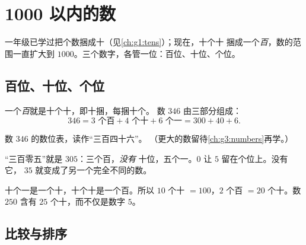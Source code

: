 \chapter{1000 以内的数}\label{ch:g2:numbers}

一年级已学过把个数捆成十（见\cref{ch:g1:tens}）；现在，十个十
捆成一个\emph{百}，数的范围一直扩大到
$1000$。三个数字，各管一位：百位、十位、个位。

\section{百位、十位、个位}

\begin{definition}[三个数位]\label{def:g2:numbers:places}
一个\emph{百}就是十个十，即十捆，每捆十个。
数 $346$ 由三部分组成：
\[
346 = 3 \text{ 个百} + 4 \text{ 个十} + 6 \text{ 个一}
= 300 + 40 + 6 .
\]
\end{definition}

\begin{omfigure}

{\small 数 $346$ 的数位表，读作“三百四十六”。
（更大的数留待\cref{ch:g3:numbers}再学。）}
\end{omfigure}

\begin{example}[零占位]\label{ex:g2:numbers:zero}
“三百零五”就是 $305$：三个百，\emph{没有}
十位，五个一。$0$ 让 $5$ 留在个位上。没有它，
$35$ 就变成了另一个完全不同的数。
\end{example}

\begin{example}[数位之间的换算]\label{ex:g2:numbers:exchange}
十个一是一个十，十个十是一个百。所以 $10$ 个十
$= 100$，$2$ 个百 $= 20$ 个十。数 $250$ 含有
$25$ 个十，而不仅是数字 $5$。
\end{example}

\section{比较与排序}

